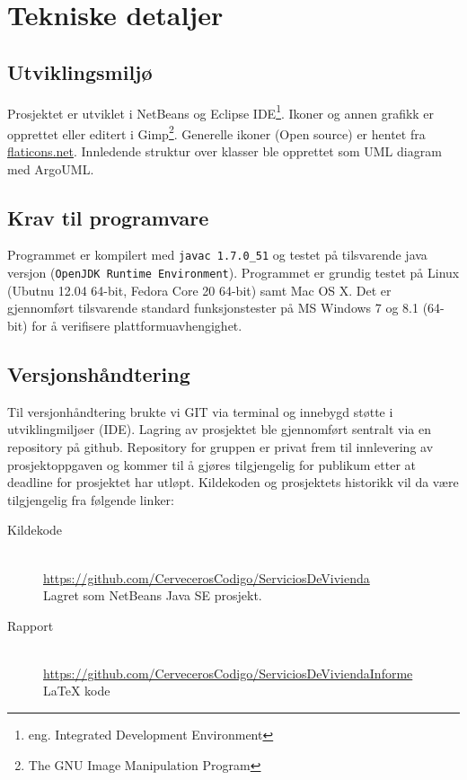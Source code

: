 \section{Tekniske detaljer}

\subsection{Utviklingsmiljø} \label{subssec:utvmiljo}
Prosjektet er utviklet i NetBeans og Eclipse IDE\footnote{eng. Integrated Development Environment}. Ikoner og annen grafikk er opprettet eller editert i Gimp\footnote{The GNU Image Manipulation Program}. Generelle ikoner (Open source) er hentet fra \href{http://www.flaticons.net}{flaticons.net}. Innledende struktur over klasser ble opprettet som UML diagram med ArgoUML.

\subsection{Krav til programvare}
Programmet er kompilert med \texttt{javac 1.7.0\_51} og testet på tilsvarende java versjon (\texttt{OpenJDK Runtime Environment}). Programmet er grundig testet på Linux (Ubutnu 12.04 64-bit, Fedora Core 20 64-bit) samt Mac OS X. Det er gjennomført tilsvarende standard funksjonstester på MS Windows 7 og 8.1 (64-bit) for å verifisere plattformuavhengighet. 

\subsection{Versjonshåndtering}
Til versjonhåndtering brukte vi GIT via terminal og innebygd støtte i utviklingmiljøer (IDE). Lagring av prosjektet ble gjennomført sentralt via en repository på github. Repository for gruppen er privat frem til innlevering av prosjektoppgaven og kommer til å gjøres tilgjengelig for publikum etter at deadline for prosjektet har utløpt. Kildekoden og prosjektets historikk vil da være tilgjengelig fra følgende linker:

\begin{description}
\item[Kildekode]
\hfill \\
\url{https://github.com/CervecerosCodigo/ServiciosDeVivienda}
\\Lagret som NetBeans Java SE prosjekt.

\item[Rapport]
\hfill \\
\url{https://github.com/CervecerosCodigo/ServiciosDeViviendaInforme}
\\ \LaTeX{} kode
\end{description}